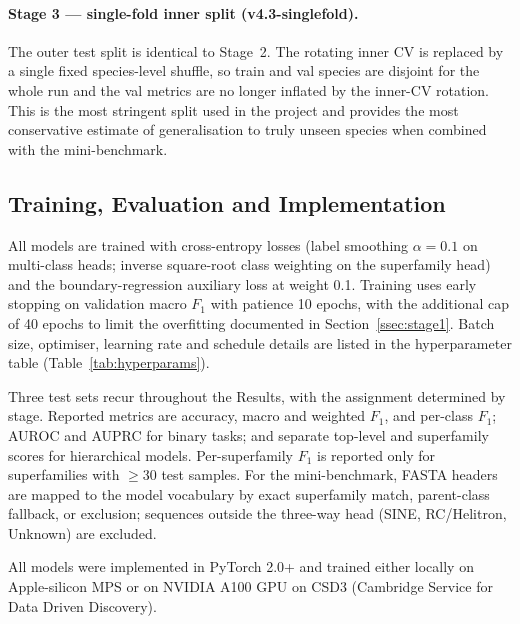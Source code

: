 \documentclass[12pt]{article}
\begin{document}
\paragraph{Stage 3 --- single-fold inner split (v4.3-singlefold).} The outer test split is identical to Stage~2. The rotating inner CV is replaced by a single fixed species-level shuffle, so train and val species are disjoint for the whole run and the val metrics are no longer inflated by the inner-CV rotation. This is the most stringent split used in the project and provides the most conservative estimate of generalisation to truly unseen species when combined with the mini-benchmark.

\subsection{Training, Evaluation and Implementation}\label{ssec:training}

All models are trained with cross-entropy losses (label smoothing $\alpha = 0.1$ on multi-class heads; inverse square-root class weighting on the superfamily head) and the boundary-regression auxiliary loss at weight 0.1. Training uses early stopping on validation macro $F_1$ with patience 10 epochs, with the additional cap of 40 epochs to limit the overfitting documented in Section~\ref{ssec:stage1}. Batch size, optimiser, learning rate and schedule details are listed in the hyperparameter table (Table~\ref{tab:hyperparams}). 

Three test sets recur throughout the Results, with the assignment determined by stage. Reported metrics are accuracy, macro and weighted $F_1$, and per-class $F_1$; AUROC and AUPRC for binary tasks; and separate top-level and superfamily scores for hierarchical models. Per-superfamily $F_1$ is reported only for superfamilies with $\geq$30 test samples. For the mini-benchmark, FASTA headers are mapped to the model vocabulary by exact superfamily match, parent-class fallback, or exclusion; sequences outside the three-way head (SINE, RC/Helitron, Unknown) are excluded.

All models were implemented in PyTorch 2.0+ and trained either locally on Apple-silicon MPS or on NVIDIA A100 GPU on CSD3 (Cambridge Service for Data Driven Discovery). 
\end{document}
